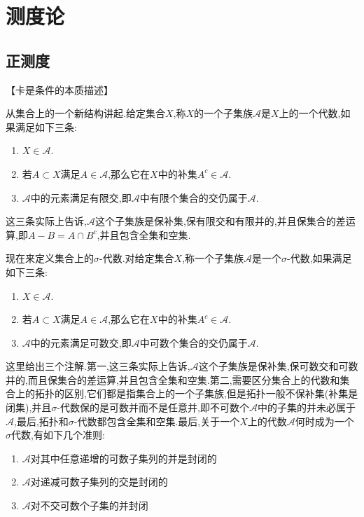 \chapter{测度论}
\section{正测度}

【卡是条件的本质描述】

从集合上的一个新结构讲起.给定集合$X$,称$X$的一个子集族$\mathscr{A}$是$X$上的一个代数,如果满足如下三条:
\begin{enumerate}
  \item $X\in\mathscr{A}$.
  \item 若$A\subset X$满足$A\in\mathscr{A}$,那么它在$X$中的补集$A^c\in\mathscr{A}$.
  \item $\mathscr{A}$中的元素满足有限交,即$\mathscr{A}$中有限个集合的交仍属于$\mathscr{A}$.
\end{enumerate}

这三条实际上告诉,$\mathscr{A}$这个子集族是保补集,保有限交和有限并的,并且保集合的差运算,即$A-B=A\cap B^c$,并且包含全集和空集.

现在来定义集合上的$\sigma$-代数.对给定集合$X$,称一个子集族$\mathscr{A}$是一个$\sigma$-代数,如果满足如下三条:
\begin{enumerate}
  \item $X\in\mathscr{A}$.
  \item 若$A\subset X$满足$A\in\mathscr{A}$,那么它在$X$中的补集$A^c\in\mathscr{A}$.
  \item $\mathscr{A}$中的元素满足可数交,即$\mathscr{A}$中可数个集合的交仍属于$\mathscr{A}$.
\end{enumerate}

这里给出三个注解.第一,这三条实际上告诉,$\mathscr{A}$这个子集族是保补集,保可数交和可数并的,而且保集合的差运算,并且包含全集和空集.第二,需要区分集合上的代数和集合上的拓扑的区别,它们都是指集合上的一个子集族,但是拓扑一般不保补集(补集是闭集),并且$\sigma$-代数保的是可数并而不是任意并,即不可数个$\mathscr{A}$中的子集的并未必属于$\mathscr{A}$,最后,拓扑和$\sigma$-代数都包含全集和空集.最后,关于一个$X$上的代数$\mathscr{A}$何时成为一个$\sigma$代数,有如下几个准则:
\begin{enumerate}
  \item $\mathscr{A}$对其中任意递增的可数子集列的并是封闭的
  \item $\mathscr{A}$对递减可数子集列的交是封闭的
  \item $\mathscr{A}$对不交可数个子集的并封闭
\end{enumerate}


